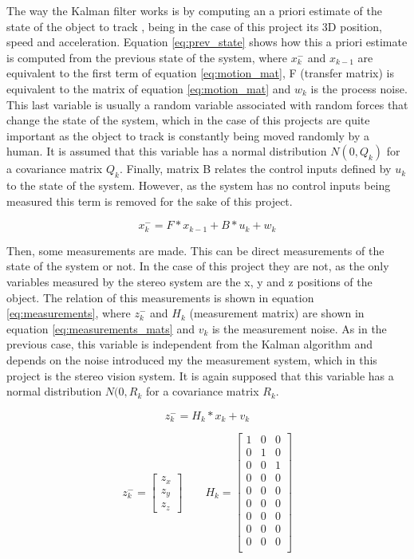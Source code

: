 The way the Kalman filter works is by computing an a priori estimate of the state of the object to track \cite{OReilly}, being in the case of this project its 3D position, speed and acceleration. Equation \ref{eq:prev_state} shows how this a priori estimate is computed from the previous state of the system, where $x_{k}^{-}$ and $x_{k-1}$ are equivalent to the first term of equation \ref{eq:motion_mat}, F (transfer matrix) is equivalent to the matrix of equation \ref{eq:motion_mat} and $w_{k}$ is the process noise. This last variable is usually a random variable associated with random forces that change the state of the system, which in the case of this projects are quite important as the object to track is constantly being moved randomly by a human. It is assumed that this variable has a normal distribution $N(0,Q_{k})$ for a covariance matrix $Q_{k}$.
Finally, matrix B relates the control inputs defined by $u_{k}$ to the state of the system. However, as the system has no control inputs being measured this term is removed for the sake of this project.

\begin{equation}
x_{k}^{-}=F*x_{k-1}+B*u_{k}+w_{k}
\label{eq:prev_state}
\end{equation}

Then, some measurements are made. This can be direct measurements of the state of the system or not. In the case of this project they are not, as the only variables measured by the stereo system are the x, y and z positions of the object. The relation of this measurements is shown in equation \ref{eq:measurements}, where $z_{k}^{-}$ and $H_{k}$ (measurement matrix) are shown in equation \ref{eq:measurements_mats} and $v_{k}$ is the measurement noise. As in the previous case, this variable is independent from the Kalman algorithm and depends on the noise introduced my the measurement system, which in this project is the stereo vision system. It is again supposed that this variable has a normal distribution $N(0,R_{k}$ for a covariance matrix $R_{k}$.

\begin{equation}
z_{k}^{-}=H_{k}*x_{k}+v_{k}
\label{eq:measurements}
\end{equation}

\begin{equation}
z_{k}^{-}=
\begin{bmatrix}
z_{x} \\ z_{y} \\ z_{z}
\end{bmatrix}
\qquad
H_{k}=
\begin{bmatrix}
1 & 0 & 0 \\
0 & 1 & 0 \\
0 & 0 & 1 \\
0 & 0 & 0 \\
0 & 0 & 0 \\
0 & 0 & 0 \\
0 & 0 & 0 \\
0 & 0 & 0 \\
0 & 0 & 0 \\
\end{bmatrix}
\label{eq:measurements_mats}
\end{equation}

